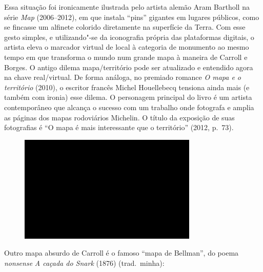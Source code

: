 Essa situação foi ironicamente ilustrada pelo artista alemão Aram
Bartholl na série \emph{Map} (2006--2012), em que instala ``pins''
gigantes em lugares públicos, como se fincasse um alfinete colorido
diretamente na superfície da Terra. Com esse gesto simples, e
utilizando"-se da iconografia própria das plataformas digitais, o artista
eleva o marcador virtual de local à categoria de monumento ao mesmo
tempo em que transforma o mundo num grande mapa à maneira de Carroll e
Borges. O antigo dilema mapa/território pode ser atualizado e entendido
agora na chave real/virtual. De forma análoga, no premiado romance
\emph{O mapa e o território} (2010), o escritor francês Michel
Houellebecq tensiona ainda mais (e também com ironia) esse dilema. O
personagem principal do livro é um artista contemporâneo que alcança o
sucesso com um trabalho onde fotografa e amplia as páginas dos mapas
rodoviários Michelin. O título da exposição de suas fotografias é ``O
mapa é mais interessante que o território'' (2012, p.~73).

\begin{figure}[!ht]

\centering
 \includegraphics[width=85mm]{./imgs/im1.jpg}
\caption{\tiny{}}

\end{figure}

Outro mapa absurdo de Carroll é o famoso ``mapa de Bellman'', do poema
\emph{nonsense} \emph{A caçada do Snark} (1876) (trad.~minha): \label{bellman}

